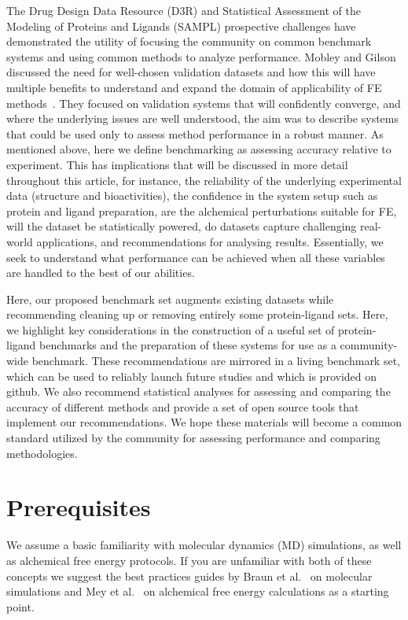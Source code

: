 \documentclass[9pt,bestpractices]{livecoms}
\begin{document}
The Drug Design Data Resource\cite{_d3r_} (D3R) and Statistical Assessment of the Modeling of Proteins and Ligands\cite{mobley_sampl_} (SAMPL) prospective challenges have demonstrated the utility of focusing the community on common benchmark systems and using common methods to analyze performance\cite{geballe_sampl2_2010,muddana_blind_2012,muddana_prediction_2012,muddana_sampl4_2014,gathiaka_d3r_2016,bannan_blind_2016,yin_overview_2017,gaieb_d3r_2018,gaieb_d3r_2019,parks_d3r_2020}. Mobley and Gilson discussed the need for well-chosen validation datasets and how this will have multiple benefits to understand and expand the domain of applicability of FE methods~\cite{mobleyPredictingBindingFree2017}. They focused on validation systems that will confidently converge, and where the underlying issues are well understood, the aim was to describe systems that could be used only to assess method performance in a robust manner. As mentioned above, here we define benchmarking as assessing accuracy relative to experiment. This has implications that will be discussed in more detail throughout this article, for instance, the reliability of the underlying experimental data (structure and bioactivities), the confidence in the system setup such as protein and ligand preparation, are the alchemical perturbations suitable for FE, will the dataset be statistically powered, do datasets capture challenging real-world applications, and recommendations for analysing results. Essentially, we seek to understand what performance can be achieved when all these variables are handled to the best of our abilities.    

Here, our proposed benchmark set augments existing datasets while recommending cleaning up or removing entirely some protein-ligand sets. Here, we highlight key considerations in the construction of a useful set of protein-ligand benchmarks and the preparation of these systems for use as a community-wide benchmark. These recommendations are mirrored in a living benchmark set, which can be used to reliably launch future studies and which is provided on github.\cite{_openforcefield_2020}
%
We also recommend statistical analyses for assessing and comparing the accuracy of different methods and provide a set of open source tools that implement our recommendations.\cite{github_openforcefield_arsenic_2020} 
%
We hope these materials will become a common standard utilized by the community for assessing performance and comparing methodologies.  


\section{Prerequisites}
We assume a basic familiarity with molecular dynamics (MD) simulations, as well as alchemical free energy protocols. If you are unfamiliar with both of these concepts we suggest the best practices guides by Braun et al.~\cite{braunBestPracticesFoundations2019} on molecular simulations and Mey et al.~\cite{meyBestPracticesAlchemical2020} on alchemical free energy calculations as a starting point. 
\end{document}
